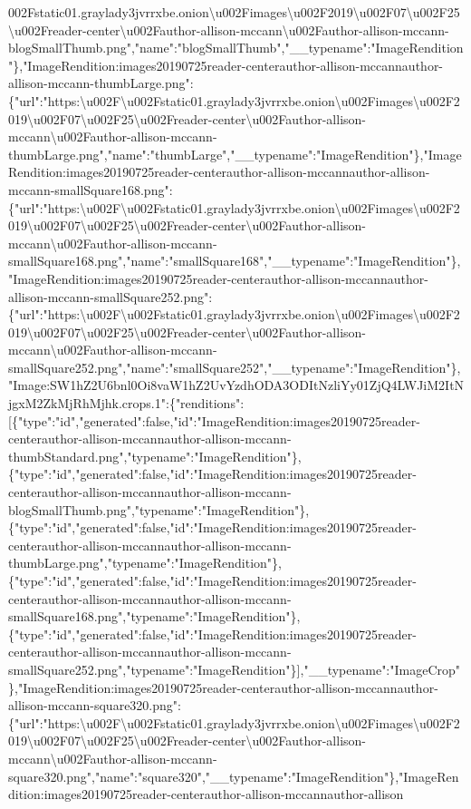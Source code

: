 002Fstatic01.graylady3jvrrxbe.onion\textbackslash{}u002Fimages\textbackslash{}u002F2019\textbackslash{}u002F07\textbackslash{}u002F25\textbackslash{}u002Freader-center\textbackslash{}u002Fauthor-allison-mccann\textbackslash{}u002Fauthor-allison-mccann-blogSmallThumb.png","name":"blogSmallThumb","\_\_typename":"ImageRendition"\},"ImageRendition:images20190725reader-centerauthor-allison-mccannauthor-allison-mccann-thumbLarge.png":\{"url":"https:\textbackslash{}u002F\textbackslash{}u002Fstatic01.graylady3jvrrxbe.onion\textbackslash{}u002Fimages\textbackslash{}u002F2019\textbackslash{}u002F07\textbackslash{}u002F25\textbackslash{}u002Freader-center\textbackslash{}u002Fauthor-allison-mccann\textbackslash{}u002Fauthor-allison-mccann-thumbLarge.png","name":"thumbLarge","\_\_typename":"ImageRendition"\},"ImageRendition:images20190725reader-centerauthor-allison-mccannauthor-allison-mccann-smallSquare168.png":\{"url":"https:\textbackslash{}u002F\textbackslash{}u002Fstatic01.graylady3jvrrxbe.onion\textbackslash{}u002Fimages\textbackslash{}u002F2019\textbackslash{}u002F07\textbackslash{}u002F25\textbackslash{}u002Freader-center\textbackslash{}u002Fauthor-allison-mccann\textbackslash{}u002Fauthor-allison-mccann-smallSquare168.png","name":"smallSquare168","\_\_typename":"ImageRendition"\},"ImageRendition:images20190725reader-centerauthor-allison-mccannauthor-allison-mccann-smallSquare252.png":\{"url":"https:\textbackslash{}u002F\textbackslash{}u002Fstatic01.graylady3jvrrxbe.onion\textbackslash{}u002Fimages\textbackslash{}u002F2019\textbackslash{}u002F07\textbackslash{}u002F25\textbackslash{}u002Freader-center\textbackslash{}u002Fauthor-allison-mccann\textbackslash{}u002Fauthor-allison-mccann-smallSquare252.png","name":"smallSquare252","\_\_typename":"ImageRendition"\},"Image:SW1hZ2U6bnl0Oi8vaW1hZ2UvYzdhODA3ODItNzliYy01ZjQ4LWJiM2ItNjgxM2ZkMjRhMjhk.crops.1":\{"renditions":{[}\{"type":"id","generated":false,"id":"ImageRendition:images20190725reader-centerauthor-allison-mccannauthor-allison-mccann-thumbStandard.png","typename":"ImageRendition"\},\{"type":"id","generated":false,"id":"ImageRendition:images20190725reader-centerauthor-allison-mccannauthor-allison-mccann-blogSmallThumb.png","typename":"ImageRendition"\},\{"type":"id","generated":false,"id":"ImageRendition:images20190725reader-centerauthor-allison-mccannauthor-allison-mccann-thumbLarge.png","typename":"ImageRendition"\},\{"type":"id","generated":false,"id":"ImageRendition:images20190725reader-centerauthor-allison-mccannauthor-allison-mccann-smallSquare168.png","typename":"ImageRendition"\},\{"type":"id","generated":false,"id":"ImageRendition:images20190725reader-centerauthor-allison-mccannauthor-allison-mccann-smallSquare252.png","typename":"ImageRendition"\}{]},"\_\_typename":"ImageCrop"\},"ImageRendition:images20190725reader-centerauthor-allison-mccannauthor-allison-mccann-square320.png":\{"url":"https:\textbackslash{}u002F\textbackslash{}u002Fstatic01.graylady3jvrrxbe.onion\textbackslash{}u002Fimages\textbackslash{}u002F2019\textbackslash{}u002F07\textbackslash{}u002F25\textbackslash{}u002Freader-center\textbackslash{}u002Fauthor-allison-mccann\textbackslash{}u002Fauthor-allison-mccann-square320.png","name":"square320","\_\_typename":"ImageRendition"\},"ImageRendition:images20190725reader-centerauthor-allison-mccannauthor-allison